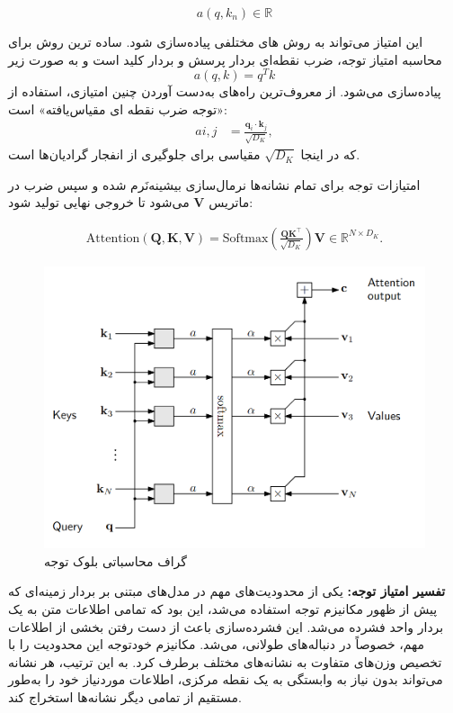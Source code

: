 $$
a(q,k_n) \in \mathbb{R}
$$

این امتیاز می‌تواند به روش های مختلفی پیاده‌سازی شود. ساده ترین روش برای محاسبه امتیاز توجه، ضرب نقطه‌ای بردار پرسش و بردار کلید است و  به صورت زیر
$$
a(q,k) = q^{T}k
$$
پیاده‌سازی می‌شود. از معروف‌ترین راه‌های به‌دست آوردن چنین امتیازی، استفاده از «توجه ضرب نقطه ای مقیاس‌یافته»%
است:
\begin{align*} 
	a{i,j} &= \frac{\mathbf{q}_i \cdot \mathbf{k}_j}{\sqrt{D_K}},
\end{align*}
که در اینجا $\sqrt{D_K}$ مقیاسی برای جلوگیری از انفجار گرادیان‌ها است.

امتیازات توجه برای تمام نشانه‌ها نرمال‌سازی بیشینه‌نَرم%
شده و سپس ضرب در ماتریس $\mathbf{V}$ می‌شود تا خروجی نهایی تولید شود:


\begin{align}
	\text{Attention}(\mathbf{Q}, \mathbf{K}, \mathbf{V}) = \text{Softmax}\left(\frac{\mathbf{Q} \mathbf{K}^\top}{\sqrt{D_K}}\right) \mathbf{V} \in \mathbb{R}^{N \times D_K}.
\end{align}

\begin{figure}
	\centering
	\includegraphics[width=0.7\linewidth]{figs/attnCompGraph}
	\caption{گراف محاسباتی بلوک توجه}
	\label{fig:attncompgraph}
\end{figure}


\textbf{تفسیر امتیاز توجه:}  
یکی از محدودیت‌های مهم در مدل‌های مبتنی بر بردار زمینه‌ای که پیش از ظهور مکانیزم توجه استفاده می‌شد، این بود که تمامی اطلاعات متن به یک بردار واحد فشرده می‌شد. این فشرده‌سازی باعث از دست رفتن بخشی از اطلاعات مهم، خصوصاً در دنباله‌های طولانی، می‌شد. مکانیزم خودتوجه این محدودیت را با تخصیص وزن‌های متفاوت به نشانه‌های مختلف برطرف کرد. به این ترتیب، هر نشانه می‌تواند  بدون نیاز به وابستگی به یک نقطه مرکزی، اطلاعات موردنیاز خود را به‌طور مستقیم از تمامی دیگر نشانه‌ها استخراج کند‍.

